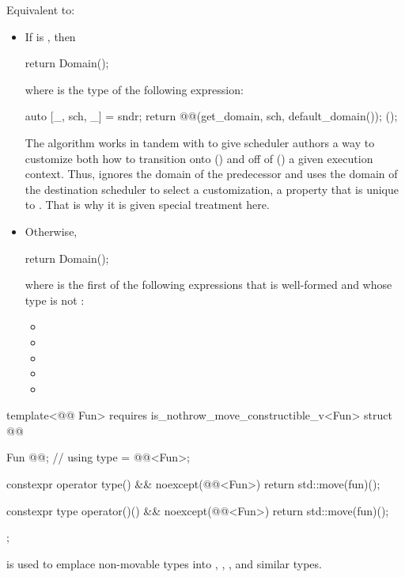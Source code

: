 \begin{itemdescr}
\pnum
\effects
Equivalent to:
\begin{itemize}
\item
If  is , then
\begin{codeblock}
return Domain();
\end{codeblock}
where  is the type of the following expression:
\begin{codeblock}
[] {
  auto [_, sch, _] = sndr;
  return @@(get_domain, sch, default_domain());
}();
\end{codeblock}
\begin{note}
The  algorithm works
in tandem with 
to give scheduler authors a way to customize both
how to transition onto () and off of ()
a given execution context.
Thus,  ignores the domain of the predecessor and
uses the domain of the destination scheduler to select a customization,
a property that is unique to .
That is why it is given special treatment here.
\end{note}
\item
Otherwise,
\begin{codeblock}
return Domain();
\end{codeblock}
where  is the first of the following expressions
that is well-formed and whose type is not :
\begin{itemize}
\item {}
\item {}
\item {}
\item {}
\item {}
\end{itemize}
\end{itemize}
\end{itemdescr}

\pnum
\begin{codeblock}
template<@@ Fun>
  requires is_nothrow_move_constructible_v<Fun>
struct @@ {
  Fun @@;                                                      // \expos
  using type = @@<Fun>;

  constexpr operator type() && noexcept(@@<Fun>) {
    return std::move(fun)();
  }

  constexpr type operator()() && noexcept(@@<Fun>) {
    return std::move(fun)();
  }
};
\end{codeblock}
\begin{note}
 is used to emplace non-movable types
into , , , and similar types.
\end{note}

